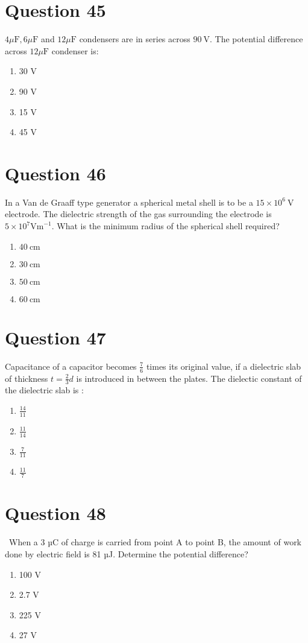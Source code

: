 \documentclass{article}
\begin{document}
\section*{Question 45}
\(4 \mu \mathrm{F}, 6 \mu \mathrm{F}\) and \(12 \mu \mathrm{F}\) condensers are in series across \(90 \mathrm{~V}\). The potential difference across \(12 \mu \mathrm{F}\) condenser is:\newline
\begin{enumerate}[label=(\alph*)]
\item 30 V
\item 90 V
\item 15 V
\item 45 V
\end{enumerate}
\newpage
\section*{Question 46}
In a Van de Graaff type generator a spherical metal shell is to be a \(15 \times 10^6 \mathrm{~V}\) electrode. The dielectric strength of the gas surrounding the electrode is \(5 \times 10^7 \mathrm{Vm}^{-1}\). What is the minimum radius of the spherical shell required?\newline
\begin{enumerate}[label=(\alph*)]
\item \(40 \mathrm{~cm}\)
\item \(30 \mathrm{~cm}\)
\item \(50 \mathrm{~cm}\)
\item \(60 \mathrm{~cm}\)
\end{enumerate}
\newpage
\section*{Question 47}
Capacitance of a capacitor becomes \(\frac{7}{6}\) times its original value, if a dielectric slab of thickness \(t=\frac{2}{3} d\) is introduced in between the plates. The dielectic constant of the dielectric slab is :
\begin{enumerate}[label=(\alph*)]
\item \(\frac{14}{11}\)
\item \(\frac{11}{14}\)
\item \(\frac{7}{11}\)
\item \(\frac{11}{7}\)
\end{enumerate}
\newpage
\section*{Question 48}
 When a 3 µC of charge is carried from point A to point B, the amount of work done by electric field is 81 µJ. Determine the potential difference?
\begin{enumerate}[label=(\alph*)]
\item 100 V
\item 2.7 V
\item 225 V
\item 27 V
\end{enumerate}
\newpage
\end{document}
